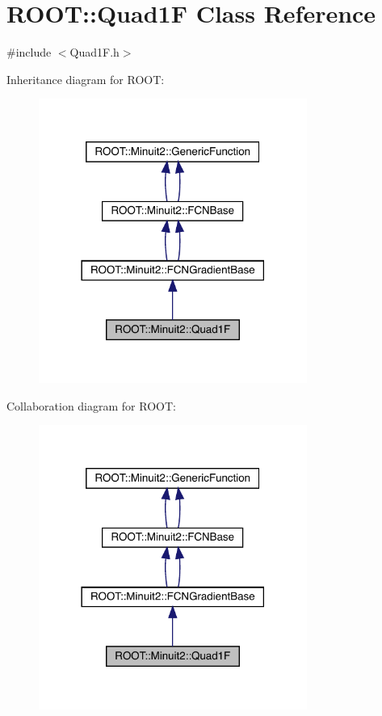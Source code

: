 \hypertarget{classROOT_1_1Minuit2_1_1Quad1F}{}\section{R\+O\+OT\+:\+:Quad1F Class Reference}
\label{classROOT_1_1Minuit2_1_1Quad1F}


{\ttfamily \#include $<$Quad1\+F.\+h$>$}



Inheritance diagram for R\+O\+OT\+:\nopagebreak
\begin{figure}[H]
\begin{center}
\leavevmode
\includegraphics[width=249pt]{dd/de0/classROOT_1_1Minuit2_1_1Quad1F__inherit__graph}
\end{center}
\end{figure}


Collaboration diagram for R\+O\+OT\+:\nopagebreak
\begin{figure}[H]
\begin{center}
\leavevmode
\includegraphics[width=249pt]{de/d9b/classROOT_1_1Minuit2_1_1Quad1F__coll__graph}
\end{center}
\end{figure}
